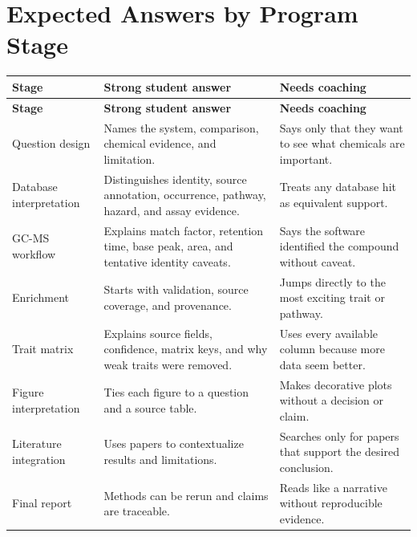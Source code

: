 \section{Expected Answers by Program Stage}
\begin{longtable}{p{}p{}p{}}
\toprule
\textbf{Stage} & \textbf{Strong student answer} & \textbf{Needs coaching}\\
\midrule
\endfirsthead
\toprule
\textbf{Stage} & \textbf{Strong student answer} & \textbf{Needs coaching}\\
\midrule
\endhead
Question design & Names the system, comparison, chemical evidence, and limitation. & Says only that they want to see what chemicals are important.\\
Database interpretation & Distinguishes identity, source annotation, occurrence, pathway, hazard, and assay evidence. & Treats any database hit as equivalent support.\\
GC-MS workflow & Explains match factor, retention time, base peak, area, and tentative identity caveats. & Says the software identified the compound without caveat.\\
Enrichment & Starts with validation, source coverage, and provenance. & Jumps directly to the most exciting trait or pathway.\\
Trait matrix & Explains source fields, confidence, matrix keys, and why weak traits were removed. & Uses every available column because more data seem better.\\
Figure interpretation & Ties each figure to a question and a source table. & Makes decorative plots without a decision or claim.\\
Literature integration & Uses papers to contextualize results and limitations. & Searches only for papers that support the desired conclusion.\\
Final report & Methods can be rerun and claims are traceable. & Reads like a narrative without reproducible evidence.\\
\bottomrule
\end{longtable}

